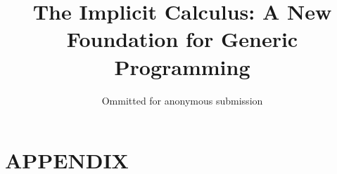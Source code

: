 \documentclass[acmlarge, anonymous, review]{acmart}
\begin{document}

\title{The Implicit Calculus: A New Foundation for Generic Programming}
\author{Ommitted for anonymous submission}

\begin{abstract}

\end{abstract}

\begin{comment}
\category{D.3.2}{Programming Languages}   
                {Language Classifications}
                [Functional Languages, Object-Oriented Languages]
\category{F.3.3}{Logics and Meanings of Programs}   
                {Studies of Program Constructs}
                []

\terms{Languages}

\keywords{
Implicit parameters, type classes, C++ concepts, generic programming,
Haskell, Scala}

\acmformat{Oliveira, B. C. d. S., Schrijvers, T., Choi, W., Lee, W., Yi, K., Wadler, P.
201?. The implicit calculus: a new foundation for generic programming.}

\begin{bottomstuff}
Author's addresses: 
B. C. d. S. Oliveira, Department of Computer Science, Hong Kong University; 
T. Schrijvers, Department of Applied Mathematics and Computer Science, Ghent University;
W. Choi {and} W. Lee {and} K. Yi, \ldots, Seoul National University;
P. Wadler, \ldots, University of Edinburgh.
\end{bottomstuff}
\end{comment}

\maketitle

















\appendix
\section*{APPENDIX}
\setcounter{section}{1}
\end{document}
